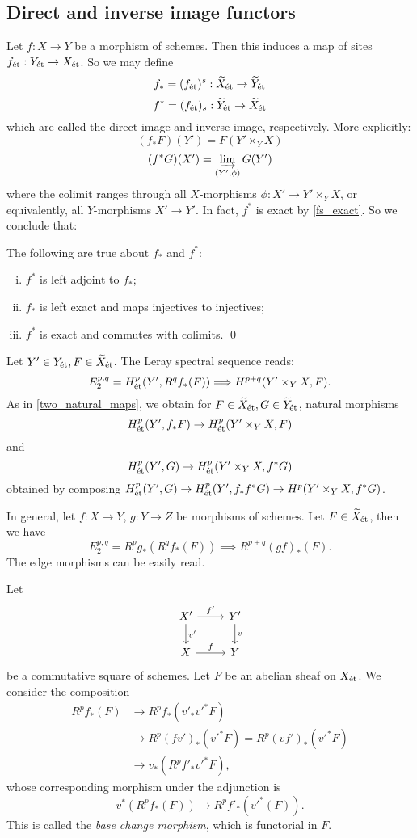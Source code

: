 \documentclass[11pt]{amsart}
\begin{document}
\subsection{Direct and inverse image functors}

Let $f:X\to Y$ be a morphism of schemes. Then this induces a map of sites $f_{\operatorname{\acute{e}t}}:Y_{\operatorname{\acute{e}t}} \to X_{\operatorname{\acute{e}t}}$. So we may define
\[f_\ast = (f_{\operatorname{\acute{e}t}})^s: \widetilde{X}_{\operatorname{\acute{e}t}} \to \widetilde{Y}_{\operatorname{\acute{e}t}}\]
\[f^\ast = (f_{\operatorname{\acute{e}t}})_s: \widetilde{Y}_{\operatorname{\acute{e}t}} \to \widetilde{X}_{\operatorname{\acute{e}t}}\]
which are called the direct image and inverse image, respectively. More explicitly:
\[(f_\ast F)(Y') = F(Y'\times_Y X)\]
\[(f^\ast G)(X') = \varinjlim_{(Y', \phi)} G(Y')\]
where the colimit ranges through all $X$-morphisms $\phi: X'\to Y'\times_Y X$, or equivalently, all $Y$-morphisms $X'\to Y'$. In fact, $f^\ast$ is exact by \ref{fs_exact}. So we conclude that:

\begin{prop} 
The following are true about $f_\ast$ and $f^\ast$:
\begin{enumerate}[(i)]
    \item $f^\ast$ is left adjoint to $f_\ast$;
    \item $f_\ast$ is left exact and maps injectives to injectives;
    \item $f^\ast$ is exact and commutes with colimits. \qed
\end{enumerate}
\end{prop}

Let $Y'\in Y_{\operatorname{\acute{e}t}}, F\in \widetilde{X}_{\operatorname{\acute{e}t}}$. The Leray spectral sequence reads:
\[E_2^{p,q} = H^p_{\operatorname{\acute{e}t}}(Y', R^qf_\ast(F)) \Longrightarrow H^{p+q}(Y'\times_Y X, F).\]
As in \ref{two_natural_maps}, we obtain for $F \in \widetilde{X}_{\operatorname{\acute{e}t}}, G\in \widetilde{Y}_{\operatorname{\acute{e}t}}$, natural morphisms
\[H^p_{\operatorname{\acute{e}t}}(Y', f_\ast F)\to H^p_{\operatorname{\acute{e}t}}(Y'\times_Y X, F)\]
and
\[H^p_{\operatorname{\acute{e}t}}(Y', G)\to H^p_{\operatorname{\acute{e}t}}(Y'\times_Y X, f^\ast G)\]
obtained by composing $H^p_{\operatorname{\acute{e}t}}(Y',G)\to H^p_{\operatorname{\acute{e}t}}(Y', f_\ast f^\ast G)\to H^p(Y'\times_Y X, f^\ast G)$.

In general, let $f:X\to Y$, $g:Y\to Z$ be morphisms of schemes. Let $F\in \widetilde{X}_{\operatorname{\acute{e}t}}$, then we have
\[E_2^{p,q} = R^pg_\ast(R^qf_\ast(F)) \implies R^{p+q}(gf)_\ast (F).\]
The edge morphisms can be easily read.

\begin{defn}
Let
\[
\begin{tikzcd}
    X' \arrow[d, "v'"] \arrow[r, "f'"] & Y' \arrow[d, "v"] \\
    X \arrow[r, "f"] & Y
\end{tikzcd}
\]
be a commutative square of schemes. Let $F$ be an abelian sheaf on $X_{\operatorname{\acute{e}t}}$. We consider the composition
\begin{align*}
    R^pf_\ast(F) &\to R^pf_\ast(v'_\ast v'^\ast F) \\
    &\to R^p(fv')_\ast(v'^\ast F) = R^p(vf')_\ast(v'^\ast F) \\
    &\to v_\ast(R^pf'_\ast v'^\ast F),
\end{align*}
whose corresponding morphism under the adjunction is
\[v^\ast(R^pf_\ast(F)) \to R^pf'_\ast(v'^\ast(F)).\]
This is called the \emph{base change morphism}, which is functorial in $F$.
\end{defn}
\end{document}
